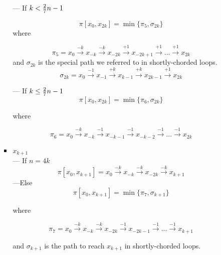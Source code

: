 \begin{itemize}
\begin{enumerate}
\begin{itemize}
---  If   $k < {2\over7}n-1$

$$ \pi[x_0,x_{2k}] = \min \{ \pi_5, \sigma_{2k}\}$$
where

$$ \pi_5 = x_{0} \xrightarrow {-k} x_{-k} \xrightarrow {-k} x_{-2k} \xrightarrow {+1} x_{-2k+1}\xrightarrow {+1} ... \xrightarrow {+1} x_{2k}$$
and $ \sigma_{2k}$ is the special path we referred to in shortly-chorded loops.
$$ \sigma_{2k}=   x_{0} \xrightarrow {-1} x_{-1} \xrightarrow {+k} x_{k-1} \xrightarrow {+k} x_{2k-1}
 \xrightarrow {+1}  x_{2k}$$

--- If    $k \leq {2\over7}n-1$
$$ \pi[x_0,x_{2k}] = \min \{ \pi_6,  \sigma_{2k}\}$$
 
 where 
 
$$\pi_6 = x_{0} \xrightarrow {-k} x_{-k} \xrightarrow {-1} x_{-k-1} \xrightarrow {-1} x_{-k-2}\xrightarrow {-1} ... \xrightarrow {-1} x_{2k}$$

 

 \item $x_{k+1}$    \\
--- If $n=4k$
$$ \pi[x_0,x_{k+1}]  = x_{0} \xrightarrow {-k} x_{-k} \xrightarrow {-k} x_{-2k} \xrightarrow {-k} x_{k+1}$$
---Else 
$$ \pi[x_0,x_{k+1}] = \min \{ \pi_7,  \sigma_{k+1}\}$$

where
 
$$ \pi_7 = x_{0} \xrightarrow {-k} x_{-k} \xrightarrow {-k} x_{-2k} \xrightarrow {-1} x_{-2k-1}\xrightarrow {-1} ... \xrightarrow {-1} x_{k+1}$$

and $ \sigma_{k+1}$ is the path to reach $x_{k+1}$ in shortly-chorded loops.


\end{itemize}
\end{enumerate}
\end{itemize}
